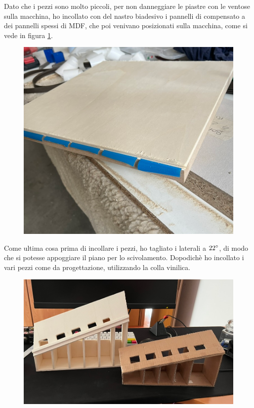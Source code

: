 \documentclass{article}
\begin{document}
Dato che i pezzi sono molto piccoli, per non danneggiare le piastre con le ventose sulla macchina, ho incollato con del nastro biadesivo i pannelli di compensato a dei pannelli spessi di MDF, che poi venivano posizionati sulla macchina, come si vede in figura \ref{fig:mdf_compensato}.

\begin{figure}[htbp]
  \centering
  \includegraphics[width=0.8\linewidth]{./images/mdf_compensato.png}
  \caption{}
  \label{fig:mdf_compensato}
\end{figure}

Come ultima cosa prima di incollare i pezzi, ho tagliato i laterali a $22 \degree$, di modo che si potesse appoggiare il piano per lo scivolamento.
Dopodichè ho incollato i vari pezzi come da progettazione, utilizzando la colla vinilica.

\begin{figure}[htbp]
  \centering
  \includegraphics[width=0.8\linewidth]{./images/slider_finito.png}
  \caption{}
  \label{fig:slider_finito}
\end{figure}
\end{document}
